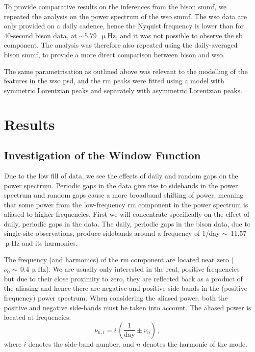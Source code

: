 To provide comparative results on the inferences from the \gls{bison} \gls{smmf}, we repeated the analysis on the power spectrum of the \gls{wso} \gls{smmf}. The \gls{wso} data are only provided on a daily cadence, hence the Nyquist frequency is lower than for 40-second \gls{bison} data, at $\sim$5.79~$\upmu\mathrm{Hz}$, and it was not possible to observe the \gls{sb} component. The analysis was therefore also repeated using the daily-averaged \gls{bison} \gls{smmf}, to provide a more direct comparison between \gls{bison} and \gls{wso}.

The same parametrisation as outlined above was relevant to the modelling of the features in the \gls{wso} \gls{psd}, and the \gls{rm} peaks were fitted using a model with symmetric Lorentzian peaks and separately with asymmetric Lorentzian peaks.


\section{Results}\label{sec:SMMF_reults}

\subsection{Investigation of the Window Function}\label{sec:window_fn}


Due to the low fill of data, we see the effects of daily and random gaps on the power spectrum. Periodic gaps in the data give rise to sidebands in the power spectrum and random gaps cause a more broadband shifting of power, meaning that some power from the low-frequency \gls{rm} component in the power spectrum is aliased to higher frequencies. First we will concentrate specifically on the effect of daily, periodic gaps in the data. The daily, periodic gaps in the \gls{bison} data, due to single-site observations, produce sidebands around a frequency of 1/day $\sim$~11.57 $\upmu$Hz and its harmonics.

The frequency (and harmonics) of the \gls{rm} component are located near zero ($\nu_0 \sim \,0.4 \, \upmu\mathrm{Hz}$). We are usually only interested in the real, positive frequencies but due to their close proximity to zero, they are reflected back as a product of the aliasing and hence there are negative and positive side-bands in the (positive frequency) power spectrum. When considering the aliased power, both the positive and negative side-bands must be taken into account. The aliased power is located at frequencies:
%
\begin{equation}
\nu_{n, i} = i \, (\frac{1}{\mathrm{day}} \pm \nu_{n}) \, ,
\label{eq:sidebands}
\end{equation}
%
where $i$ denotes the side-band number, and $n$ denotes the harmonic of the mode.


